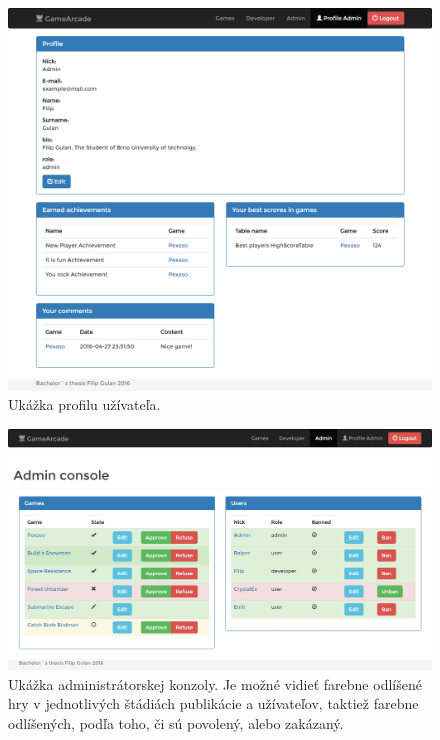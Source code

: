 \begin{figure}[h]
  \centering
  \includegraphics[scale=0.33]{fig/ukazka-profil.png}
  \caption{Ukážka profilu užívateľa.}
  \label{fig:ukazka-profil}
\end{figure}

\begin{figure}[h]
  \centering
  \includegraphics[scale=0.35]{fig/ukazka-admin.png}
  \caption{Ukážka administrátorskej konzoly. Je možné vidieť farebne odlíšené hry v jednotlivých štádiách publikácie a užívateľov, taktiež farebne odlíšených, podľa toho, či sú povolený, alebo zakázaný.}
  \label{fig:ukazka-admin}
\end{figure}

